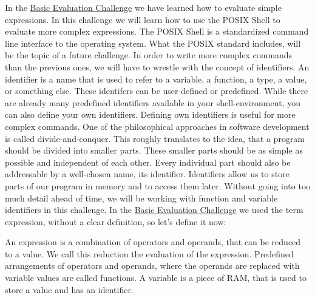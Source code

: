 \begin{challenge}
    \begin{chadescription}
        In the \href{https://github.com/STEMgraph/ac584d6d-1397-49d9-8319-85e9fbd4b765}{Basic Evaluation Challenge} we have learned how to evaluate simple expressions.
        In this challenge we will learn how to use the POSIX Shell to evaluate more complex expressions.
        The POSIX Shell is a standardized command line interface to the operating system.
        What the POSIX standard includes, will be the topic of a future challenge.
        In order to write more complex commands than the previous ones, we will have to wrestle with the concept of identifiers. 
        An identifier is a name that is used to refer to a variable, a function, a type, a value, or something else.
        These identifers can be user-defined or predefined.
        While there are already many predefined identifiers available in your shell-environment, you can also define your own identifiers.
        Defining own identifiers is useful for more complex commands.
        One of the philosophical approaches in software development is called divide-and-conquer.
        This roughly translates to the idea, that a program should be divided into smaller parts.
        These smaller parts should be as simple as possible and independent of each other.
        Every individual part should also be addressable by a well-chosen name, its identifier.
        Identifiers allow us to store parts of our program in memory and to access them later.
        Without going into too much detail ahead of time, we will be working with function and variable identifiers in this challenge.
        In the \href{https://github.com/STEMgraph/ac584d6d-1397-49d9-8319-85e9fbd4b765}{Basic Evaluation Challenge} we used the term expression, without a clear definition, so let's define it now:
        \begin{definition}
            An expression is a combination of operators and operands, that can be reduced to a value. 
            We call this reduction the evaluation of the expression.
            Predefined arrangements of operators and operands, where the operands are replaced with variable values are called functions.
            A variable is a piece of RAM, that is used to store a value and has an identifier.
        \end{definition}


\end{chadescription}
\end{challenge}
